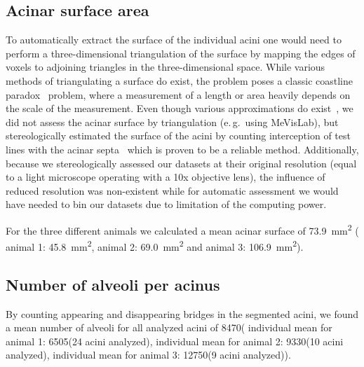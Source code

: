 \documentclass[a4paper,DIV=calc,abstract,english]{scrartcl}
\newcommand{\eg}{e.\,g.\ }
\newcommand{\numberofaciniB}{24}
\newcommand{\numberofaciniD}{10}
\newcommand{\numberofaciniE}{9}
\newcommand{\numberofalveoliB}{6505}
\newcommand{\numberofalveoliD}{9330}
\newcommand{\numberofalveoliE}{12750}
\newcommand{\meannumberofalveoli}{8470} %
\newcommand{\acinarsurfaceB}{45.8} %
\newcommand{\acinarsurfaceD}{69.0} %
\newcommand{\acinarsurfaceE}{106.9} %
\newcommand{\meanacinarsurface}{73.9} %
\newcommand{\airspacesurfaceB}{4214} %
\newcommand{\airspacesurfaceD}{3628} %
\newcommand{\airspacesurfaceE}{5177} %
\newcommand{\meanairspacesurface}{4340} %
\begin{document}
\subsection{Acinar surface area}\label{sec:results:acinar surface area}
To automatically extract the surface of the individual acini one would need to perform a three-dimensional triangulation of the surface by mapping the edges of voxels to adjoining triangles in the three-dimensional space.
While various methods of triangulating a surface do exist, the problem poses a classic coastline paradox~\cite{Mandelbrot1967a} problem, where a measurement of a length or area heavily depends on the scale of the measurement.
Even though various approximations do exist~\cite{Lorensen1987,Schneiders1996}, we did not assess the acinar surface by triangulation (\eg using MeVisLab), but stereologically estimated the surface of the acini by counting interception of test lines with the acinar septa~\cite{Hsia2010} which is proven to be a reliable method.
Additionally, because we stereologically assessed our datasets at their original resolution (equal to a light microscope operating with a 10x objective lens), the influence of reduced resolution was non-existent while for automatic assessment we would have needed to bin our datasets due to limitation of the computing power. 

For the three different animals we calculated a mean acinar surface of \SI{\meanacinarsurface}{\milli\meter\squared} (%
animal 1: \SI{\acinarsurfaceB}{\milli\meter\squared},
animal 2: \SI{\acinarsurfaceD}{\milli\meter\squared} and
animal 3: \SI{\acinarsurfaceE}{\milli\meter\squared}).


\subsection{Number of alveoli per acinus}
By counting appearing and disappearing bridges in the segmented acini, we found a mean number of alveoli for all analyzed acini of \meannumberofalveoli\xspace (%
individual mean for animal 1: \numberofalveoliB\xspace (\numberofaciniB\xspace acini analyzed),
individual mean for animal 2: \numberofalveoliD\xspace (\numberofaciniD\xspace acini analyzed),
individual mean for animal 3: \numberofalveoliE\xspace (\numberofaciniE\xspace acini analyzed)).
\end{document}
